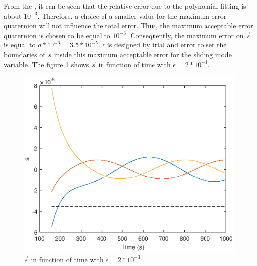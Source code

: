 %
From the , it can be seen that the relative error due to the polynomial fitting is about $10^{-3}$. Therefore, a choice of a smaller value for the maximum error quaternion will not influence the total error. Thus, the maximum acceptable error quaternion is chosen to be equal to $10^{-3}$. Consequently, the maximum error on $\vec s$ is equal to $d*10^{-3} = 3.5*10^{-5}$. $\epsilon$ is designed by trial and error to set the boundaries of $\vec s$ inside this maximum acceptable error for the sliding mode variable. The figure \ref{fig:design_eps} shows $\vec s$ in function of time with $\epsilon = 2*10^{-3}$.  
%
\begin{figure}[H]
	\centering
	\includegraphics[width=0.8\linewidth]{figures/design_eps.eps}
	\caption{$\vec s$ in function of time with $ \epsilon = 2*10^{-3}$}
	\label{fig:design_eps}
\end{figure} 
